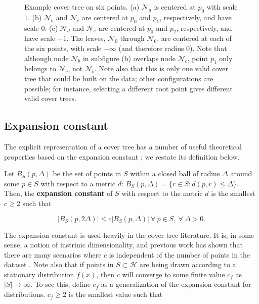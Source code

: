 \begin{figure}
  \vspace*{-0.5em}
\caption{Example cover tree on six points.  (a) $\mathscr{N}_a$ is centered at
$p_0$ with scale $1$.  (b) $\mathscr{N}_b$ and $\mathscr{N}_c$ are centered at
$p_0$ and $p_1$, respectively, and have scale $0$.  (c) $\mathscr{N}_d$ and
$\mathscr{N}_e$ are centered at $p_0$ and $p_2$, respectively, and have scale
$-1$.  The leaves, $\mathscr{N}_0$ through $\mathscr{N}_6$, are centered at each
of the six points, with scale $-\infty$ (and therefore radius 0).  Note that
although node $\mathscr{N}_b$ in subfigure (b) overlaps node $\mathscr{N}_c$,
point $p_1$ only belongs to $\mathscr{N}_c$, not $\mathscr{N}_b$.  Note also
that this is only one valid cover tree that could be built on the data; other
configurations are possible; for instance, selecting a different root point
gives different valid cover trees.}
\label{fig:example-cover-tree}
\end{figure}

\subsection{Expansion constant}

The explicit representation of a cover tree has a number of useful theoretical
properties based on the expansion constant \citep{karger2002finding}; we restate
its definition below.

\begin{defn}
\label{def:int_dim}
Let $B_S(p, \Delta)$ be the set of points in $S$ within a closed ball of radius
$\Delta$ around some $p \in S$ with respect to a metric $d$:
%
$B_S(p, \Delta) = \{ r \in S \colon d(p, r) \leq \Delta \}$.
%
Then, the {\bf expansion constant} of $S$ with respect to the metric $d$ is the
smallest $c \ge 2$ such that

\begin{equation}
| B_S(p, 2 \Delta) | \le c | B_S(p, \Delta) |\ \forall\ p \in S,\
\forall\ \Delta > 0.
\end{equation}

\end{defn}

The expansion constant is used heavily in the cover tree literature.  It is,
in some sense, a notion of instrinic dimensionality, and previous work has shown
that there are many scenarios where $c$ is independent of the number of points
in the dataset \citep{karger2002finding, langford2006,
krauthgamer2004navigating, ram2009}.  Note also that if points in $S \subset
\mathcal{H}$ are being drawn according to a stationary distribution $f(x)$, then
$c$ will converge to some finite value $c_f$ as $|S| \to \infty$.  To see this,
define $c_f$ as a generalization of the expansion constant for distributions.
$c_f \ge 2$ is the smallest value such that


